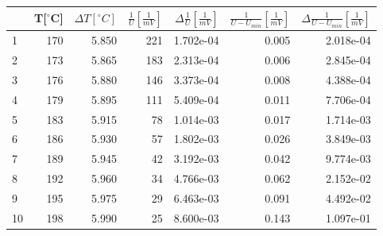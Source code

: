 \documentclass[a4paper,10pt]{article}
\begin{document}
\begin{figure}
\begin{tabular}{lrrrrrr}
\toprule
{} &  T[$^\circ $C] &  $\Delta T [^\circ C]$ &  $\frac{1}{U}[\frac{1}{mV}]$ &  $\Delta \frac{1}{U}[\frac{1}{mV}]$ &  $\frac{1}{U-U_{min}}[\frac{1}{mV}]$ &  $\Delta \frac{1}{U-U_{min}}[\frac{1}{mV}]$ \\
\midrule
1 &            170 &                  5.850 &                          221 &                           1.702e-04 &                                0.005 &                                   2.018e-04 \\
2 &            173 &                  5.865 &                          183 &                           2.313e-04 &                                0.006 &                                   2.845e-04 \\
3 &            176 &                  5.880 &                          146 &                           3.373e-04 &                                0.008 &                                   4.388e-04 \\
4 &            179 &                  5.895 &                          111 &                           5.409e-04 &                                0.011 &                                   7.706e-04 \\
5 &            183 &                  5.915 &                           78 &                           1.014e-03 &                                0.017 &                                   1.714e-03 \\
6 &            186 &                  5.930 &                           57 &                           1.802e-03 &                                0.026 &                                   3.849e-03 \\
7 &            189 &                  5.945 &                           42 &                           3.192e-03 &                                0.042 &                                   9.774e-03 \\
8 &            192 &                  5.960 &                           34 &                           4.766e-03 &                                0.062 &                                   2.152e-02 \\
9 &            195 &                  5.975 &                           29 &                           6.463e-03 &                                0.091 &                                   4.492e-02 \\
10 &            198 &                  5.990 &                           25 &                           8.600e-03 &                                0.143 &                                   1.097e-01 \\

\end{tabular}
\end{figure}
\end{document}
